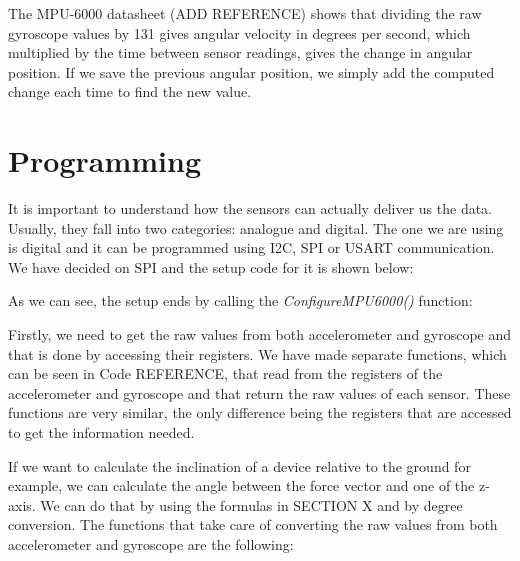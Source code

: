 The MPU-6000 datasheet (ADD REFERENCE) shows that dividing the raw gyroscope values by 131 gives angular velocity in degrees per second, which multiplied by the time between sensor readings, gives the change in angular position. If we save the previous angular position, we simply add the computed change each time to find the new value.


\section{Programming}
It is important to understand how the sensors can actually deliver us the data. Usually, they fall into two categories: analogue and digital. The one we are using is digital and it can be programmed using I2C, SPI or USART communication. We have decided on SPI and the setup code for it is shown below:



As we can see, the setup ends by calling the \textit{ConfigureMPU6000()} function:



Firstly, we need to get the raw values from both accelerometer and gyroscope and that is done by accessing their registers. We have made separate functions, which can be seen in Code REFERENCE, that read from the registers of the accelerometer and gyroscope and that return the raw values of each sensor. These functions are very similar, the only difference being the registers that are accessed to get the information needed. 



If we want to calculate the inclination of a device relative to the ground for example, we can calculate the angle between the force vector and one of the z-axis. We can do that by using the formulas in SECTION X and by degree conversion. The functions that take care of converting the raw values from both accelerometer and gyroscope are the following:



